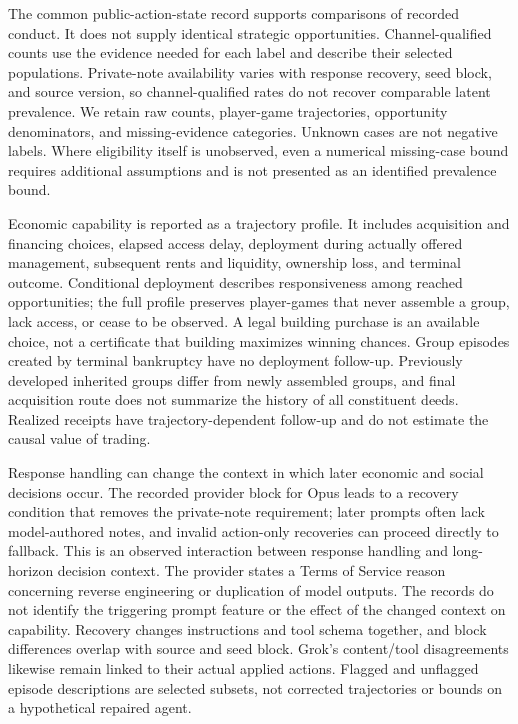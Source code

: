 The common public-action-state record supports comparisons of recorded conduct.
It does not supply identical strategic opportunities. Channel-qualified counts
use the evidence needed for each label and describe their selected populations.
Private-note availability varies with response recovery, seed block, and source
version, so channel-qualified rates do not recover comparable latent prevalence.
We retain raw counts, player-game trajectories, opportunity denominators, and
missing-evidence categories. Unknown cases are not negative labels. Where
eligibility itself is unobserved, even a numerical missing-case bound requires
additional assumptions and is not presented as an identified prevalence bound.

Economic capability is reported as a trajectory profile. It includes acquisition
and financing choices, elapsed access delay, deployment during actually offered
management, subsequent rents and liquidity, ownership loss, and terminal outcome.
Conditional deployment describes responsiveness among reached opportunities;
the full profile preserves player-games that never assemble a group, lack
access, or cease to be observed. A legal building purchase is an available
choice, not a certificate that building maximizes winning chances. Group episodes
created by terminal bankruptcy have no deployment follow-up. Previously developed
inherited groups differ from newly assembled groups, and final acquisition route
does not summarize the history of all constituent deeds. Realized receipts have
trajectory-dependent follow-up and do not estimate the causal value of trading.

Response handling can change the context in which later economic and social
decisions occur. The recorded provider block for Opus leads to a recovery
condition that removes the private-note requirement; later prompts often lack
model-authored notes, and invalid action-only recoveries can proceed directly
to fallback. This is an observed interaction between response handling and
long-horizon decision context. The provider states a Terms of Service reason
concerning reverse engineering or duplication of model outputs. The records do
not identify the triggering prompt feature or the effect of the changed context
on capability. Recovery changes instructions and tool schema together, and block
differences overlap with source and seed block. Grok's content/tool disagreements
likewise remain linked to their actual applied actions. Flagged and unflagged
episode descriptions are selected subsets, not corrected trajectories or bounds
on a hypothetical repaired agent.

